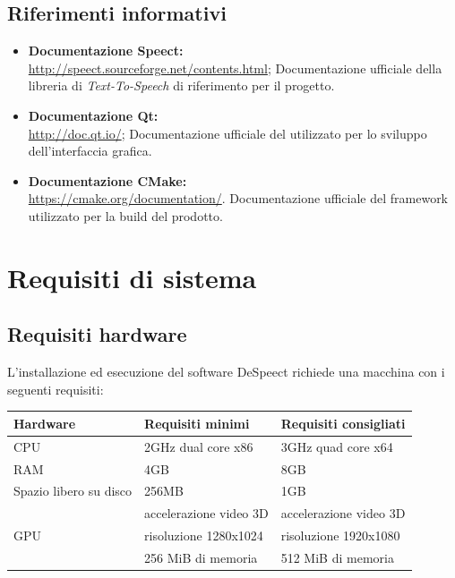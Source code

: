 \documentclass[openany,12pt,a4paper]{report}
\begin{document}
	\newpage
	
	\section{Riferimenti informativi}

	\begin{itemize}
		\item \textbf{Documentazione Speect:} \\
		\url{http://speect.sourceforge.net/contents.html};
		\subitem Documentazione ufficiale della libreria di \textit{Text-To-Speech} di riferimento per il progetto.
		
		\item \textbf{Documentazione Qt:} \\
		\url{http://doc.qt.io/};
		\subitem Documentazione ufficiale del  utilizzato per lo sviluppo dell'interfaccia grafica.
		
		\item \textbf{Documentazione CMake:} \\
		\url{https://cmake.org/documentation/}.
		\subitem Documentazione ufficiale del framework utilizzato per la build del prodotto. 
	\end{itemize}

	\chapter{Requisiti di sistema}
	
	\section{Requisiti hardware}
	
	L'installazione ed esecuzione del software DeSpeect richiede una macchina con i seguenti requisiti:
	\begin{center}
		\begin{longtable}{| p{40mm} | p{60mm} | p{60mm} |}
			\hline
			\textbf{Hardware} & \textbf{Requisiti minimi} & \textbf{Requisiti consigliati} \\
			\hline CPU & 2GHz dual core x86 & 3GHz quad core x64 \\
			\hline RAM & 4GB & 8GB \\
			\hline Spazio libero su disco & 256MB & 1GB \\
			\hline  \multirow{3}{*}{GPU}
			& accelerazione video 3D & accelerazione video 3D \\ 
			& risoluzione 1280x1024 & risoluzione 1920x1080 \\
			& 256 MiB di memoria & 512 MiB di memoria \\
			\hline
		\end{longtable}
	\end{center}
\end{document}

